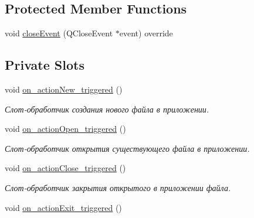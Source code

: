 \subsection*{Protected Member Functions}
\begin{DoxyCompactItemize}
\item 
void \mbox{\hyperlink{class_main_window_a05fb9d72c044aa3bb7d187b994704e2f}{close\+Event}} (Q\+Close\+Event $\ast$event) override
\end{DoxyCompactItemize}
\subsection*{Private Slots}
\begin{DoxyCompactItemize}
\item 
\mbox{\label{class_main_window_aed8d4c16aaa87ae02a2de2edd5fc91c7}} 
void \mbox{\hyperlink{class_main_window_aed8d4c16aaa87ae02a2de2edd5fc91c7}{on\+\_\+action\+New\+\_\+triggered}} ()
\begin{DoxyCompactList}\small\item\em Слот-\/обработчик создания нового файла в приложении. \end{DoxyCompactList}\item 
\mbox{\label{class_main_window_a48ed0a16f674e38e0e2a24274852a9af}} 
void \mbox{\hyperlink{class_main_window_a48ed0a16f674e38e0e2a24274852a9af}{on\+\_\+action\+Open\+\_\+triggered}} ()
\begin{DoxyCompactList}\small\item\em Слот-\/обработчик открытия существующего файла в приложении. \end{DoxyCompactList}\item 
\mbox{\label{class_main_window_a189b458b701fa572969a22f8718ce5b0}} 
void \mbox{\hyperlink{class_main_window_a189b458b701fa572969a22f8718ce5b0}{on\+\_\+action\+Close\+\_\+triggered}} ()
\begin{DoxyCompactList}\small\item\em Слот-\/обработчик закрытия открытого в приложении файла. \end{DoxyCompactList}\item 
\mbox{\label{class_main_window_ab4487c4b02224acd4a0193d38b704ddb}} 
void \mbox{\hyperlink{class_main_window_ab4487c4b02224acd4a0193d38b704ddb}{on\+\_\+action\+Exit\+\_\+triggered}} ()

\end{DoxyCompactItemize}
